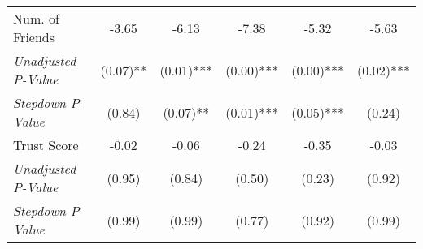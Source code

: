 \begin{tabular}{l c c c c c}
Num. of Friends & -3.65 & -6.13 & -7.38 & -5.32 & -5.63 \\
\quad \textit{Unadjusted P-Value} & (0.07)** & (0.01)*** & (0.00)*** & (0.00)*** & (0.02)*** \\
\quad \textit{Stepdown P-Value} & (0.84) & (0.07)** & (0.01)*** & (0.05)*** & (0.24) \\
Trust Score & -0.02 & -0.06 & -0.24 & -0.35 & -0.03 \\
\quad \textit{Unadjusted P-Value} & (0.95) & (0.84) & (0.50) & (0.23) & (0.92) \\
\quad \textit{Stepdown P-Value} & (0.99) & (0.99) & (0.77) & (0.92) & (0.99) \\
\bottomrule
\end{tabular}
